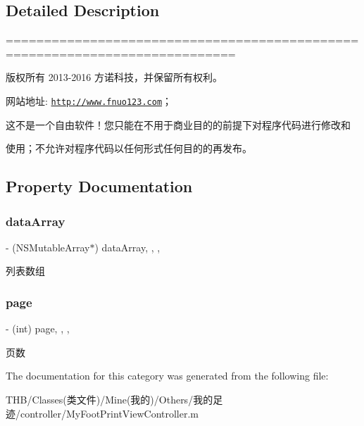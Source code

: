 \subsection{Detailed Description}
============================================================================

版权所有 2013-\/2016 方诺科技，并保留所有权利。

网站地址\+: \href{http://www.fnuo123.com}{\tt http\+://www.\+fnuo123.\+com}； 



这不是一个自由软件！您只能在不用于商业目的的前提下对程序代码进行修改和

使用；不允许对程序代码以任何形式任何目的的再发布。 

 

\subsection{Property Documentation}
\mbox{\label{category_my_foot_print_view_controller_07_08_a50d10794a3fb6eb2e315e7d29ae57b7a}} 
\subsubsection{\texorpdfstring{data\+Array}{dataArray}}
{\footnotesize\ttfamily -\/ (N\+S\+Mutable\+Array$\ast$) data\+Array\hspace{0.3cm}{\ttfamily [read]}, {\ttfamily [write]}, {\ttfamily [nonatomic]}, {\ttfamily [strong]}}

列表数组 \mbox{\label{category_my_foot_print_view_controller_07_08_a33c20d3635235aebf7982e8ed58a3ee6}} 
\subsubsection{\texorpdfstring{page}{page}}
{\footnotesize\ttfamily -\/ (int) page\hspace{0.3cm}{\ttfamily [read]}, {\ttfamily [write]}, {\ttfamily [nonatomic]}, {\ttfamily [assign]}}

页数 

The documentation for this category was generated from the following file\+:\begin{DoxyCompactItemize}
\item 
T\+H\+B/\+Classes(类文件)/\+Mine(我的)/\+Others/我的足迹/controller/My\+Foot\+Print\+View\+Controller.\+m\end{DoxyCompactItemize}
